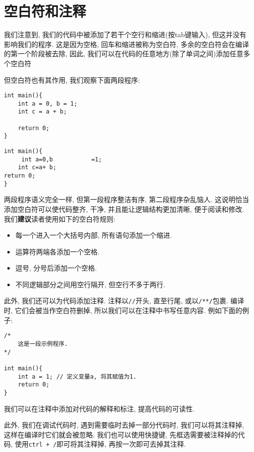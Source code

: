     \section{空白符和注释} \label{空白符和注释}
        我们注意到, 我们的代码中被添加了若干个空行和缩进(按tab键输入), 但这并没有影响我们的程序. 这是因为空格, 回车和缩进被称为空白符, 多余的空白符会在编译的第一个阶段被去除, 因此, 我们可以在代码的任意地方(除了单词之间)添加任意多个空白符

        但空白符也有其作用, 我们观察下面两段程序:
\begin{lstlisting}
int main(){
    int a = 0, b = 1;
    int c = a + b;

    return 0;
}
\end{lstlisting}

\begin{lstlisting}
int main(){
     int a=0,b           =1;
    int c=a+ b;
return 0;
}
\end{lstlisting}

        两段程序语义完全一样, 但第一段程序整洁有序, 第二段程序杂乱恼人. 这说明恰当添加空白符可以使代码整齐, 干净, 并且能让逻辑结构更加清晰, 便于阅读和修改. 我们\textbf{建议}读者使用如下的空白符规则:
        \begin{itemize}
            \item 每一个进入一个大括号内部, 所有语句添加一个缩进.
            \item 运算符两端各添加一个空格.
            \item 逗号, 分号后添加一个空格.
            \item 不同逻辑部分之间用空行隔开, 但空行不多于两行.
        \end{itemize}

        此外, 我们还可以为代码添加注释. 注释以\texttt{//}开头, 直至行尾, 或以\texttt{/**/}包裹. 编译时, 它们会被当作空白符删掉, 所以我们可以在注释中书写任意内容. 例如下面的例子:
\begin{lstlisting}
/*
    这是一段示例程序.
*/

int main(){
    int a = 1; // 定义变量a, 将其赋值为1.
    return 0;
}
\end{lstlisting}

        我们可以在注释中添加对代码的解释和标注, 提高代码的可读性.

        此外, 我们在调试代码时, 遇到需要临时去掉一部分代码时, 我们可以将其注释掉, 这样在编译时它们就会被忽略. 我们也可以使用快捷键, 先框选需要被注释掉的代码, 使用\texttt{ctrl + /}即可将其注释掉, 再按一次即可去掉其注释.

